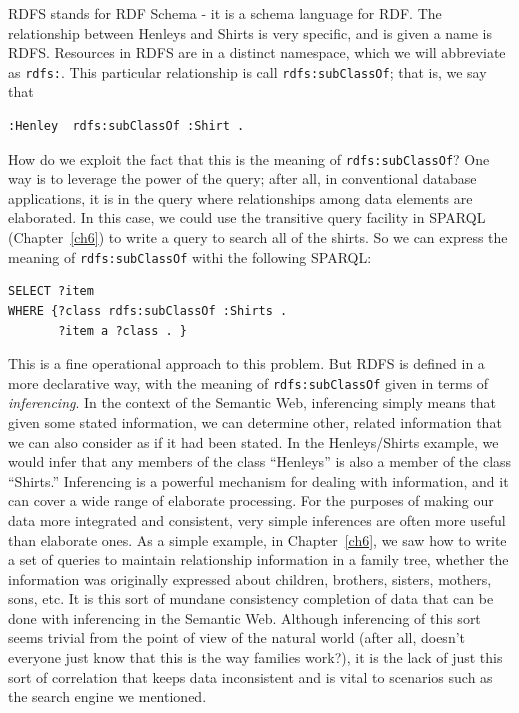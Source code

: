 RDFS stands for RDF Schema - it is a schema language for RDF.  The relationship 
between Henleys and Shirts is very specific, and is given a name is RDFS.  Resources in 
RDFS are in a distinct namespace, which we will abbreviate as \texttt{rdfs:}. 
This particular relationship is call \texttt{rdfs:subClassOf}; that is, we
say that

\begin{lstlisting}
:Henley  rdfs:subClassOf :Shirt . 
\end{lstlisting}


How do we exploit the fact that this is the meaning of \texttt{rdfs:subClassOf}? 
One way is to leverage the power of the query;
after all, in conventional database applications, it is in the query
where relationships among data elements are elaborated. In this case, we
could use the transitive query facility in SPARQL (Chapter~\ref{ch6}) to write a
query to search all of the shirts.  So we can express the meaning of \texttt{rdfs:subClassOf} withi 
the following SPARQL:

\begin{lstlisting}
SELECT ?item
WHERE {?class rdfs:subClassOf :Shirts .
       ?item a ?class . }
\end{lstlisting}

This is a fine operational approach to this problem. But RDFS is defined 
in a more declarative way, with the meaning of \texttt{rdfs:subClassOf} given 
in terms of
\emph{inferencing}. In the context of the Semantic Web, inferencing
simply means that given some stated information, we can determine other,
related information that we can also consider as if it had been stated.
In the Henleys/Shirts example, we would infer that any members of the
class ``Henleys'' is also a member of the class ``Shirts.'' Inferencing
is a powerful mechanism for dealing with information, and it can cover a
wide range of elaborate processing. For the purposes of making our data
more integrated and consistent, very simple inferences are often more
useful than elaborate ones. As a simple example, in Chapter~\ref{ch6}, we saw
how to write a set of queries to maintain relationship information in a
family tree, whether the information was originally expressed about
children, brothers, sisters, mothers, sons, etc. It is this sort of
mundane consistency completion of data that can be done with inferencing
in the Semantic Web. Although inferencing of this sort seems trivial
from the point of view of the natural world (after all, doesn't everyone
just know that this is the way families work?), it is the lack of just
this sort of correlation that keeps data inconsistent and is vital to
scenarios such as the search engine we mentioned.

